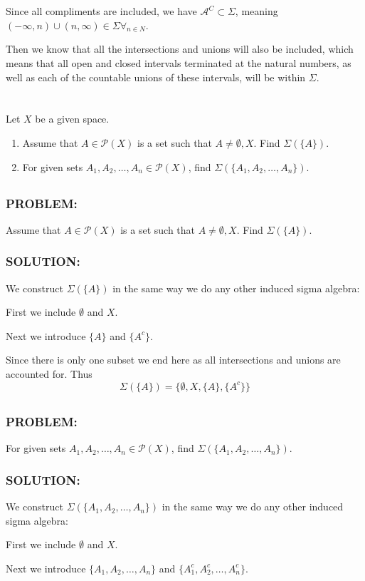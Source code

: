 \documentclass[]{article}
\newcommand{\Problem}{\subsubsection*{\textbf{PROBLEM:}}}
\newcommand{\Solution}{\subsubsection*{\textbf{SOLUTION:}}}
\begin{document}
Since all compliments are included, we have $\mathcal{A}^C \subset \Sigma$, meaning $(-\infty, n) \cup (n, \infty) \in \Sigma \forall_{n \in N}$.

Then we know that all the intersections and unions will also be included, which means that all open and closed intervals terminated at the natural numbers, as well as each of the countable unions of these intervals, will be within $\Sigma$.


\newpage
\section{}
Let $X$ be a given space.
\begin{enumerate}
    \item Assume that $A \in \mathcal{P}(X)$ is a set such that $A \neq \emptyset, X$.
    Find $\Sigma(\{A\})$.
    \item For given sets $A_1, A_2, \dots, A_n \in \mathcal{P}(X)$, find $\Sigma(\{A_1,A_2,\dots,A_n\})$.
\end{enumerate}

\subsection{}
\Problem
Assume that $A \in \mathcal{P}(X)$ is a set such that $A \neq \emptyset, X$.
Find $\Sigma(\{A\})$.

\Solution
We construct $\Sigma(\{A\})$ in the same way we do any other induced sigma algebra:

First we include $\emptyset$ and $X$.

Next we introduce $\{A\}$ and $\{A^c\}$.

Since there is only one subset we end here as all intersections and unions are accounted for. 
Thus \[
    \Sigma(\{A\}) = \{\emptyset, X, \{A\}, \{A^c\}\}
\]

\subsection{}
\Problem
For given sets $A_1, A_2, \dots, A_n \in \mathcal{P}(X)$, find $\Sigma(\{A_1,A_2,\dots,A_n\})$.

\Solution
We construct $\Sigma(\{A_1,A_2,\dots,A_n\})$ in the same way we do any other induced sigma algebra:

First we include $\emptyset$ and $X$.

Next we introduce $\{A_1,A_2,\dots,A_n\}$ and $\{A_1^c,A_2^c,\dots,A_n^c\}$.
\end{document}
